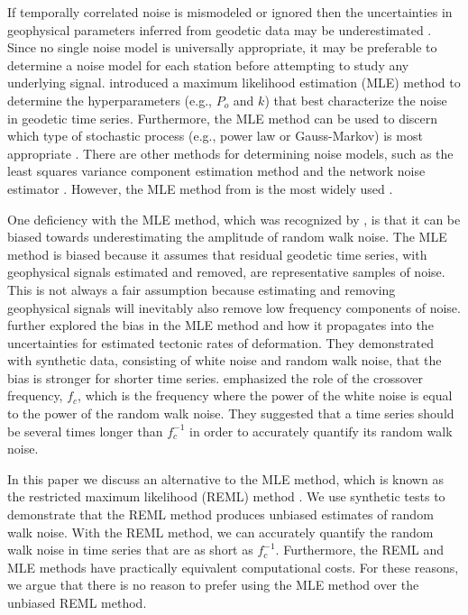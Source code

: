 If temporally correlated noise is mismodeled or ignored then the
uncertainties in geophysical parameters inferred from geodetic data
may be underestimated \citep[e.g.,][]{Zhang1997,Langbein2012}. Since
no single noise model is universally appropriate, it may be preferable
to determine a noise model for each station before attempting to study
any underlying signal. \citet{Langbein1997} introduced a maximum
likelihood estimation (MLE) method to determine the hyperparameters
(e.g., $P_o$ and $k$) that best characterize the noise in geodetic
time series. Furthermore, the MLE method can be used to discern which
type of stochastic process (e.g., power law or Gauss-Markov) is most
appropriate \citep{Langbein2004}. There are other methods for
determining noise models, such as the least squares variance component
estimation method \citep{Amiri-Simkooei2007} and the network noise
estimator \citep{Dmitrieva2015}. However, the MLE method from
\citet{Langbein1997} is the most widely used
\citep[e.g.,][]{Langbein2004, Langbein2008, Zhang1997, Mao1999,
Williams2004, Hill2009, King2009, Murray2017}.

One deficiency with the MLE method, which was recognized by
\citet{Langbein1997}, is that it can be biased towards underestimating
the amplitude of random walk noise. The MLE method is biased because
it assumes that residual geodetic time series, with geophysical
signals estimated and removed, are representative samples of noise.
This is not always a fair assumption because estimating and removing
geophysical signals will inevitably also remove low frequency
components of noise. \citet{Langbein2012} further explored the bias in
the MLE method and how it propagates into the uncertainties for
estimated tectonic rates of deformation. They demonstrated with
synthetic data, consisting of white noise and random walk noise, that
the bias is stronger for shorter time series. \citet{Langbein2012}
emphasized the role of the crossover frequency, $f_c$, which is the
frequency where the power of the white noise is equal to the power of
the random walk noise. They suggested that a time series should be
several times longer than $f_c^{-1}$ in order to accurately quantify
its random walk noise.

In this paper we discuss an alternative to the MLE method, which is
known as the restricted maximum likelihood (REML) method
\citep[e.g.,][]{Cressie1992}.  We use synthetic tests to demonstrate
that the REML method produces unbiased estimates of random walk noise.
With the REML method, we can accurately quantify the random walk noise
in time series that are as short as $f_c^{-1}$. Furthermore, the REML
and MLE methods have practically equivalent computational costs. For
these reasons, we argue that there is no reason to prefer using the
MLE method over the unbiased REML method.

